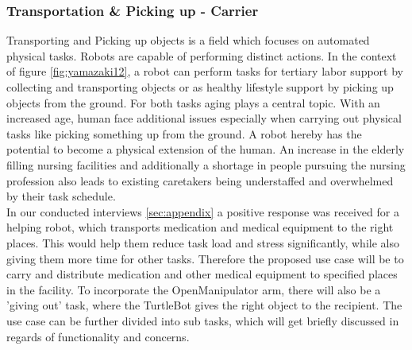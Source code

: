 \documentclass[plainarticle,zihtitle,english,final,hyperref,utf8]{zihpub}
\begin{document}
\subsubsection{Transportation \& Picking up - Carrier}
\label{sec:transporting}
Transporting and Picking up objects is a field which focuses on automated physical tasks. Robots are capable of performing distinct actions. In the context of figure \ref{fig:yamazaki12}, a robot can perform tasks for tertiary labor support by collecting and transporting objects or as healthy lifestyle support by picking up objects from the ground. For both tasks aging plays a central topic. With an increased age, human face additional issues especially when carrying out physical tasks like picking something up from the ground. A robot hereby has the potential to become a physical extension of the human. An increase in the elderly filling nursing facilities and additionally a shortage in people pursuing the nursing profession also leads to existing caretakers being understaffed and overwhelmed by their task schedule. \\
\newline
In our conducted interviews \ref{sec:appendix} a positive response was received for a helping robot, which transports medication and medical equipment to the right places. This would help them reduce task load and stress significantly, while also giving them more time for other tasks.
Therefore the proposed use case will be to carry and distribute medication and other medical equipment to specified places in the facility. To incorporate the OpenManipulator arm, there will also be a 'giving out' task, where the TurtleBot gives the right object to the recipient.
The use case can be further divided into sub tasks, which will get briefly discussed in regards of functionality and concerns.
\end{document}
